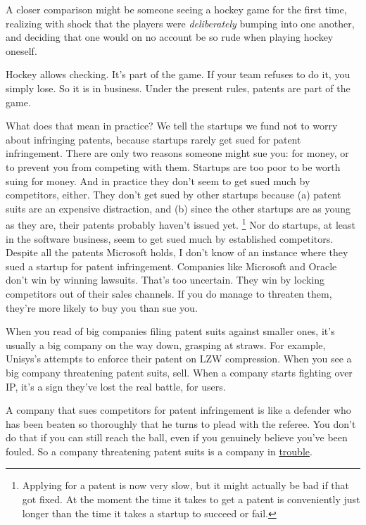 A closer comparison might be someone seeing a hockey game for the first
time, realizing with shock that the players were \emph{deliberately}
bumping into one another, and deciding that one would on no account be
so rude when playing hockey oneself.

Hockey allows checking. It's part of the game. If your team refuses to
do it, you simply lose. So it is in business. Under the present rules,
patents are part of the game.

What does that mean in practice? We tell the startups we fund not to
worry about infringing patents, because startups rarely get sued for
patent infringement. There are only two reasons someone might sue you:
for money, or to prevent you from competing with them. Startups are too
poor to be worth suing for money. And in practice they don't seem to get
sued much by competitors, either. They don't get sued by other startups
because (a) patent suits are an expensive distraction, and (b) since the
other startups are as young as they are, their patents probably haven't
issued yet. \footnote{Applying for a patent is now very slow, but it might actually be
bad if that got fixed. At the moment the time it takes to get a patent
is conveniently just longer than the time it takes a startup to succeed
or fail.} Nor do startups, at least in the
software business, seem to get sued much by established competitors.
Despite all the patents Microsoft holds, I don't know of an instance
where they sued a startup for patent infringement. Companies like
Microsoft and Oracle don't win by winning lawsuits. That's too
uncertain. They win by locking competitors out of their sales channels.
If you do manage to threaten them, they're more likely to buy you than
sue you.

When you read of big companies filing patent suits against smaller ones,
it's usually a big company on the way down, grasping at straws. For
example, Unisys's attempts to enforce their patent on LZW compression.
When you see a big company threatening patent suits, sell. When a
company starts fighting over IP, it's a sign they've lost the real
battle, for users.

A company that sues competitors for patent infringement is like a
defender who has been beaten so thoroughly that he turns to plead with
the referee. You don't do that if you can still reach the ball, even if
you genuinely believe you've been fouled. So a company threatening
patent suits is a company in
\href{http://www.theregister.co.uk/2006/03/15/azul_sues_sun/}{trouble}.

